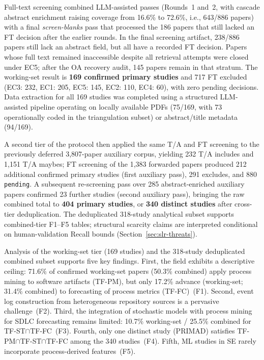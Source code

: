 Full-text screening combined LLM-assisted passes (Rounds~1 and~2, with cascade
abstract enrichment raising coverage from 16.6\% to 72.6\%, i.e., 643/886
papers) with a final \emph{screen-blanks} pass that processed the 186 papers
that still lacked an FT decision after the earlier rounds. In the final
screening artifact, 238/886 papers still lack an abstract field, but all have
a recorded FT decision. Papers whose full text remained inaccessible despite
all retrieval attempts were closed under EC5; after the OA recovery audit,
145 papers remain in that stratum. The working-set
result is \textbf{169 confirmed primary studies} and 717 FT excluded (EC3:
232, EC1: 205, EC5: 145, EC2: 110, EC4: 60), with zero pending decisions.
Data extraction for all 169 studies was completed using a structured
LLM-assisted pipeline operating on locally available PDFs (75/169, with 73
operationally coded in the triangulation subset) or abstract/title metadata
(94/169).

A second tier of the protocol then applied the same T/A and FT screening
to the previously deferred 3{,}807-paper auxiliary corpus, yielding 232
T/A includes and 1{,}151 T/A maybes; FT screening of the 1{,}383 forwarded
papers produced 212 additional confirmed primary studies (first auxiliary
pass), 291 excludes, and 880 \texttt{pending}. A subsequent re-screening
pass over 285 abstract-enriched auxiliary papers confirmed 23 further
studies (second auxiliary pass), bringing the raw combined total to
\textbf{404 primary studies}, or \textbf{340 distinct studies} after
cross-tier deduplication. The deduplicated 318-study analytical subset
supports combined-tier F1--F5 tables; structural scarcity claims are
interpreted conditional on human-validation Recall bounds
(Section~\ref{sec:slr-threats}).

Analysis of the working-set tier (169 studies) and the 318-study deduplicated
combined subset supports five key findings. First, the field exhibits a
descriptive ceiling: 71.6\% of confirmed working-set papers (50.3\% combined)
apply process mining to software artifacts (TF-PM), but only 17.2\% advance
(working-set; 31.4\% combined) to forecasting of process metrics
(TF-FC)~(F1). Second, event log construction from heterogeneous repository
sources is a pervasive challenge~(F2). Third, the integration of stochastic
models with process mining for SDLC forecasting remains limited: 10.7\%
working-set / 25.5\% combined for TF-ST$\cap$TF-FC~(F3). Fourth, only one distinct study (PRIMAD) satisfies TF-PM$\cap$TF-ST$\cap$TF-FC among the 340 studies~(F4). Fifth, ML studies in SE rarely incorporate
process-derived features~(F5).

